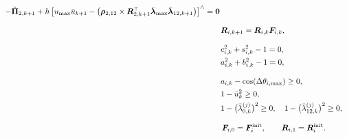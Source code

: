 \begin{subequations}
\begin{align}
\begin{aligned}
-\hat{\bm{\Pi}}_{2,k+1}
+h
\left[
u_{\max}\bar u_{k+1}
-
\left(
\bm{\rho}_{2,12}
\times
\bm{R}_{2,k+1}^{\top}\bar{\bm{\lambda}}_{\max}\bar{\bm{\lambda}}_{12,k+1}
\right)
\right]^{\wedge}
&=\bm{0}
\end{aligned}
\label{eq:controlled_acrobot_pop_rotation_2}\\[0.8em]
&\hspace{-0.9em}\bm{R}_{i,k+1}=\bm{R}_{i,k}\bm{F}_{i,k},
\label{eq:controlled_acrobot_pop_kinematics}\\[0.8em]
&\hspace{-0.9em}c_{i,k}^2+s_{i,k}^2-1=0,
\label{eq:controlled_acrobot_pop_so2_R}\\
&\hspace{-0.9em}a_{i,k}^2+b_{i,k}^2-1=0,
\label{eq:controlled_acrobot_pop_so2_F}\\[0.8em]
&\hspace{-0.9em}a_{i,k}-\cos(\Delta\theta_{i,\max})\geq0,
\label{eq:controlled_acrobot_pop_step_bound}\\
&\hspace{-0.9em}1-\bar u_k^2\geq0,
\label{eq:controlled_acrobot_pop_control_bound}\\
&\hspace{-0.9em}1-\bigl(\bar{\lambda}_{0,k}^{(j)}\bigr)^2\geq0,
\quad
1-\bigl(\bar{\lambda}_{12,k}^{(j)}\bigr)^2\geq0,
\label{eq:controlled_acrobot_pop_multiplier_bound}\\[0.8em]
&\hspace{-0.9em}\begin{gathered}
\bm{F}_{i,0}=\bm{F}_i^{\mathrm{init}},\qquad
\bm{R}_{i,1}=\bm{R}_i^{\mathrm{init}}.
\end{gathered}
\label{eq:controlled_acrobot_pop_initial}
\end{align}
\end{subequations}
\endgroup


